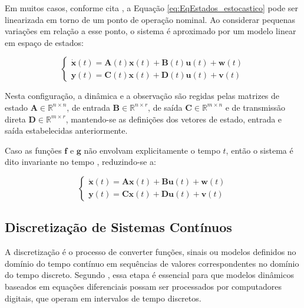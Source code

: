 \documentclass[a4paper,12pt]{article}
\begin{document}

Em muitos casos, conforme cita , a Equação \eqref{eq:EqEstados_estocastico} pode ser linearizada em torno de um ponto de operação nominal. Ao considerar pequenas variações em relação a esse ponto, o sistema é aproximado por um modelo linear em espaço de estados:

\begin{equation}
    \begin{cases}
        \dot{\mathbf{x}}(t) = \mathbf{A}(t) \mathbf{x}(t) + \mathbf{B}(t)\mathbf{u}(t) + \mathbf{w}(t) \\
        \mathbf{y}(t) = \mathbf{C}(t)\mathbf{x}(t) + \mathbf{D}(t)\mathbf{u}(t) + \mathbf{v}(t)
    \end{cases}
    \label{eq:espaco_estados_linear}
\end{equation}

Nesta configuração, a dinâmica e a observação são regidas pelas matrizes de estado $\mathbf{A} \in \mathbb{R}^{n \times n}$, de entrada $\mathbf{B} \in \mathbb{R}^{n \times r}$, de saída $\mathbf{C} \in \mathbb{R}^{m \times n}$ e de transmissão direta $\mathbf{D} \in \mathbb{R}^{m \times r}$, mantendo-se as definições dos vetores de estado, entrada e saída estabelecidas anteriormente.

Caso as funções $\mathbf{f}$ e $\mathbf{g}$ não envolvam explicitamente o tempo $t$, então o sistema é dito invariante no tempo \cite{ogata2010}, reduzindo-se a:

\begin{equation}
    \begin{cases}
        \dot{\mathbf{x}}(t) = \mathbf{A}\mathbf{x}(t) + \mathbf{B}\mathbf{u}(t) + \mathbf{w}(t) \\
        \mathbf{y}(t) = \mathbf{C}\mathbf{x}(t) + \mathbf{D}\mathbf{u}(t) + \mathbf{v}(t)
    \end{cases}
    \label{eq:espaco_estados_linear_invariante}
\end{equation}

\subsection{Discretização de Sistemas Contínuos}
\label{subsec:Discretizacao}

A discretização é o processo de converter funções, sinais ou modelos definidos no domínio do tempo contínuo em sequências de valores correspondentes no domínio do tempo discreto. Segundo , essa etapa é essencial para que modelos dinâmicos baseados em equações diferenciais possam ser processados por computadores digitais, que operam em intervalos de tempo discretos. 
\end{document}
